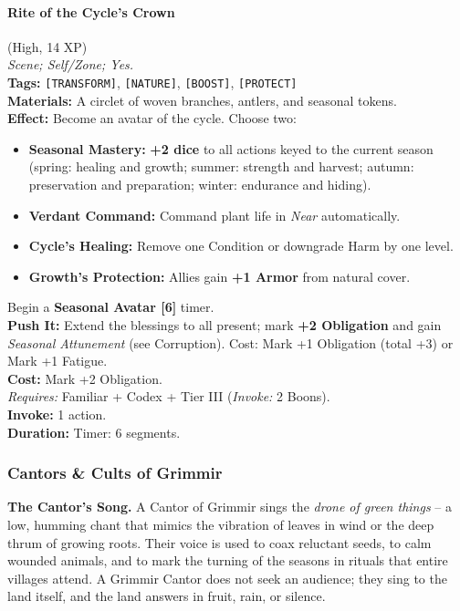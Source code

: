 \paragraph{Rite of the Cycle's Crown} (High, 14 XP) \hfill \\
\emph{Scene; Self/Zone; Yes.} \\
\textbf{Tags:} \texttt{[TRANSFORM]}, \texttt{[NATURE]}, \texttt{[BOOST]}, \texttt{[PROTECT]} \\
\textbf{Materials:} A circlet of woven branches, antlers, and seasonal tokens. \\
\textbf{Effect:} Become an avatar of the cycle. Choose two:
\begin{itemize}
  \item \textbf{Seasonal Mastery:} \textbf{+2 dice} to all actions keyed to the current season (spring: healing and growth; summer: strength and harvest; autumn: preservation and preparation; winter: endurance and hiding).
  \item \textbf{Verdant Command:} Command plant life in \textit{Near} automatically.
  \item \textbf{Cycle's Healing:} Remove one Condition or downgrade Harm by one level.
  \item \textbf{Growth's Protection:} Allies gain \textbf{+1 Armor} from natural cover.
\end{itemize}
Begin a \textbf{Seasonal Avatar [6]} timer. \\
\textbf{Push It:} Extend the blessings to all present; mark \textbf{+2 Obligation} and gain \textit{Seasonal Attunement} (see Corruption). Cost: Mark +1 Obligation (total +3) or Mark +1 Fatigue. \\
\textbf{Cost:} Mark +2 Obligation. \\
\textit{Requires:} Familiar + Codex + Tier III (\textit{Invoke:} 2 Boons). \\
\textbf{Invoke:} 1 action. \\
\textbf{Duration:} Timer: 6 segments.

\subsubsection*{Cantors \& Cults of Grimmir}

\textbf{The Cantor's Song.} A Cantor of Grimmir sings the \textit{drone of green things} -- a low, humming chant that mimics the vibration of leaves in wind or the deep thrum of growing roots. Their voice is used to coax reluctant seeds, to calm wounded animals, and to mark the turning of the seasons in rituals that entire villages attend. A Grimmir Cantor does not seek an audience; they sing to the land itself, and the land answers in fruit, rain, or silence.

